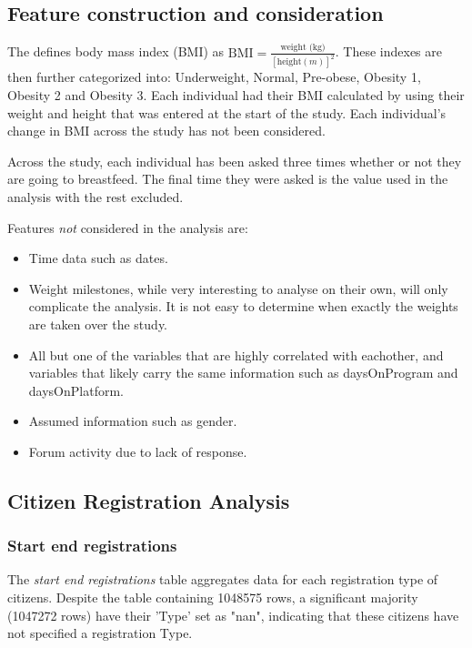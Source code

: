 \documentclass[12pt]{article}
\begin{document}
\subsection{Feature construction and consideration}
	
	The \cite{WHO_BMI} defines body mass index (BMI) as $\text{BMI} = \frac{\text{weight (kg)}}{\left[\text{height} (m)\right]^2}$. These indexes are then further categorized into: Underweight, Normal, Pre-obese, Obesity 1, Obesity 2 and Obesity 3. Each individual had their BMI calculated by using their weight and height that was entered at the start of the study. Each individual's change in BMI across the study has not been considered.

	Across the study, each individual has been asked three times whether or not they are going to breastfeed. The final time they were asked is the value used in the analysis with the rest excluded.
	
	Features \emph{not} considered in the analysis are:
	\begin{itemize}
		\item Time data such as dates.
		\item Weight milestones, while very interesting to analyse on their own, will only complicate the analysis. It is not easy to determine when exactly the weights are taken over the study.
		\item All but one of the variables that are highly correlated with eachother, and variables that likely carry the same information such as daysOnProgram and daysOnPlatform.
		\item Assumed information such as gender.
		\item Forum activity due to lack of response.
	\end{itemize} 

\subsection{Citizen Registration Analysis }

\subsubsection{Start end registrations}
The \textit{start end registrations} table aggregates data for each registration type of citizens. 
Despite the table containing 1048575 rows, a significant majority (1047272 rows) have their 'Type' set as "nan", indicating that these citizens have not specified a registration Type.
\end{document}
